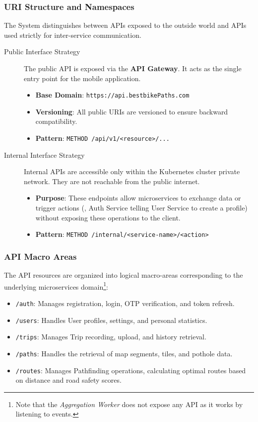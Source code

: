 \subsubsection*{URI Structure and Namespaces}
The System distinguishes between APIs exposed to the outside world and APIs used strictly for inter-service communication.
\begin{description}
    \item[Public Interface Strategy]
    The public API is exposed via the \textbf{API Gateway}. It acts as the single entry point for the mobile application.
\begin{itemize}
    \item \textbf{Base Domain}: \texttt{https://api.bestbikePaths.com}
    \item \textbf{Versioning}: All public URIs are versioned to ensure backward compatibility.
    \item \textbf{Pattern}: \texttt{METHOD /api/v1/<resource>/...}
    \end{itemize}
    \item[Internal Interface Strategy]
    Internal APIs are accessible only within the Kubernetes cluster private network. They are not reachable from the public internet.
\begin{itemize}
    \item \textbf{Purpose}: These endpoints allow microservices to exchange data or trigger actions (\eg, Auth Service telling User Service to create a profile) without exposing these operations to the client.
    \item \textbf{Pattern}: \texttt{METHOD /internal/<service-name>/<action>}

\end{itemize}
\end{description}


\subsubsection*{API Macro Areas}
The API resources are organized into logical macro-areas corresponding to the underlying microservices domain\footnote{Note that the \emph{Aggregation Worker} does not expose any API as it works by listening to events.}:

\begin{itemize}
    \item \texttt{/auth}: Manages registration, login, OTP verification, and token refresh.
    \item \texttt{/users}: Handles User profiles, settings, and personal statistics.
    \item \texttt{/trips}: Manages Trip recording, upload, and history retrieval.
    \item \texttt{/paths}: Handles the retrieval of map segments, tiles, and pothole data.
    \item \texttt{/routes}: Manages Pathfinding operations, calculating optimal routes based on distance and road safety scores.
\end{itemize}


